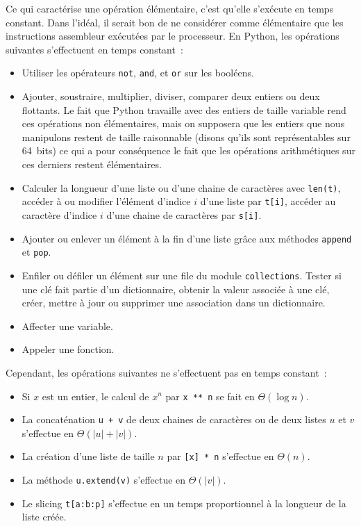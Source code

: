 \documentclass{magnolia}
\begin{document}
\vspace{2ex}
Ce qui caractérise une opération élémentaire, c'est qu'elle s'exécute
en temps constant. Dans l'idéal, il serait bon de ne considérer comme élémentaire
que les instructions assembleur exécutées par le processeur. En Python, les opérations
suivantes s'effectuent en temps constant~:
\begin{itemize}
  \item Utiliser les opérateurs \verb_not_, \verb!and!, et \verb!or! sur les booléens.
  \item Ajouter, soustraire, multiplier, diviser, comparer deux entiers ou deux flottants.
    Le fait que Python travaille avec des entiers de taille variable rend ces
    opérations non élémentaires, mais on supposera que les entiers que nous manipulons
    restent de taille raisonnable (disons qu'ils sont représentables sur 64~bits) ce
    qui a pour conséquence le fait que les opérations arithmétiques sur ces derniers restent
    élémentaires.
  \item Calculer la longueur d'une liste ou d'une chaine de caractères avec \verb!len(t)!, accéder à ou modifier
    l'élément d'indice $i$ d'une liste par \verb!t[i]!, accéder au caractère d'indice
    $i$ d'une chaine de caractères par \verb!s[i]!.
  \item Ajouter ou enlever un élément à la fin d'une liste grâce aux méthodes
    \verb_append_ et \verb_pop_.
  \item Enfiler ou défiler un élément sur une file du module \verb_collections_. Tester
    si une clé fait partie d'un dictionnaire, obtenir la valeur associée à une clé,
    créer, mettre à jour ou supprimer une association dans un dictionnaire.
  \item Affecter une variable.
  \item Appeler une fonction.
\end{itemize}
Cependant, les opérations suivantes ne s'effectuent pas en temps constant~:
\begin{itemize}
\item Si $x$ est un entier, le calcul de $x^n$ par \verb!x ** n! se fait en $\Theta(\log n)$.
\item La concaténation \verb!u + v! de deux chaines de caractères ou de deux listes
  $u$ et $v$ s'effectue en $\Theta(|u| + |v|)$.
\item La création d'une liste de taille $n$ par \verb![x] * n! s'effectue en
  $\Theta(n)$.
\item La méthode \verb!u.extend(v)! s'effectue en $\Theta(|v|)$.
\item Le slicing \verb!t[a:b:p]! s'effectue en un temps proportionnel à la longueur
  de la liste créée.
\end{itemize}
\end{document}
